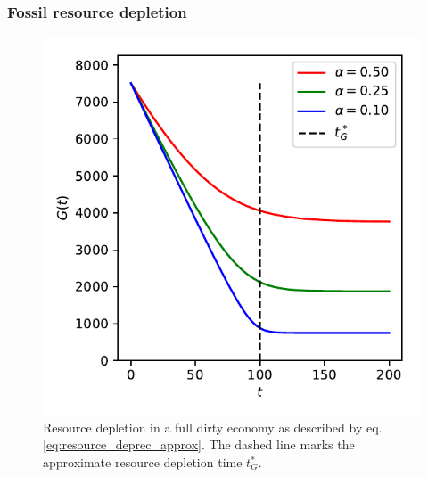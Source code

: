 \subsubsection{Fossil resource depletion}
\label{sec:resource_depletion}
\begin{figure}
    \vspace{-.8 cm}
    \hspace{-1.8 cm}
	\includegraphics[width = .6 \textwidth]{figures/g_depletion.pdf}
	\caption{Resource depletion in a full dirty economy as described by eq. \eqref{eq:resource_deprec_approx}. The dashed line marks the approximate resource depletion time $t^*_G$. \label{fig:g_depletion}}
\end{figure}


